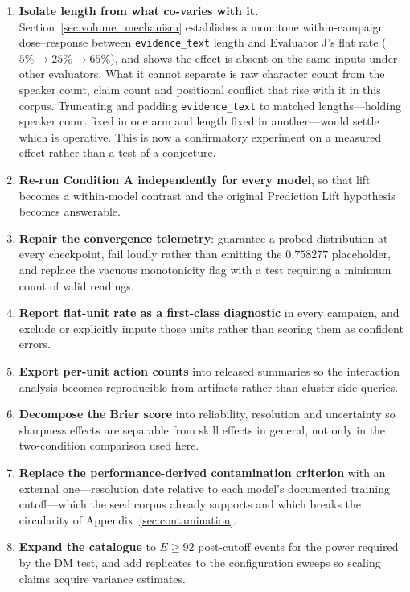 \documentclass[11pt,journal,onecolumn]{IEEEtran}
\begin{document}
\begin{enumerate}
    \item[(iii)] \textbf{Isolate length from what co-varies with it.} Section~\ref{sec:volume_mechanism} establishes a monotone within-campaign dose--response between \texttt{evidence\_text} length and Evaluator J's flat rate ($5\% \to 25\% \to 65\%$), and shows the effect is absent on the same inputs under other evaluators. What it cannot separate is raw character count from the speaker count, claim count and positional conflict that rise with it in this corpus. Truncating and padding \texttt{evidence\_text} to matched lengths---holding speaker count fixed in one arm and length fixed in another---would settle which is operative. This is now a confirmatory experiment on a measured effect rather than a test of a conjecture.
    \item[(iv)] \textbf{Re-run Condition A independently for every model}, so that lift becomes a within-model contrast and the original Prediction Lift hypothesis becomes answerable.
    \item[(v)] \textbf{Repair the convergence telemetry}: guarantee a probed distribution at every checkpoint, fail loudly rather than emitting the $0.758277$ placeholder, and replace the vacuous monotonicity flag with a test requiring a minimum count of valid readings.
    \item[(vi)] \textbf{Report flat-unit rate as a first-class diagnostic} in every campaign, and exclude or explicitly impute those units rather than scoring them as confident errors.
    \item[(vii)] \textbf{Export per-unit action counts} into released summaries so the interaction analysis becomes reproducible from artifacts rather than cluster-side queries.
    \item[(viii)] \textbf{Decompose the Brier score} into reliability, resolution and uncertainty so sharpness effects are separable from skill effects in general, not only in the two-condition comparison used here.
    \item[(ix)] \textbf{Replace the performance-derived contamination criterion} with an external one---resolution date relative to each model's documented training cutoff---which the seed corpus already supports and which breaks the circularity of Appendix~\ref{sec:contamination}.
    \item[(x)] \textbf{Expand the catalogue} to $E \geq 92$ post-cutoff events for the power required by the DM test, and add replicates to the configuration sweeps so scaling claims acquire variance estimates.

\end{enumerate}
\end{document}
